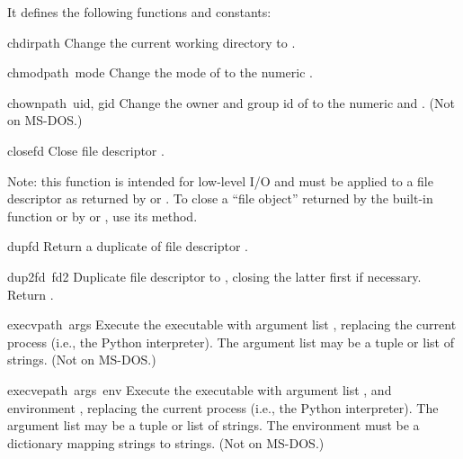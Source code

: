It defines the following functions and constants:

\renewcommand{\indexsubitem}{(in module posix)}
\begin{funcdesc}{chdir}{path}
Change the current working directory to .
\end{funcdesc}

\begin{funcdesc}{chmod}{path\, mode}
Change the mode of  to the numeric .
\end{funcdesc}

\begin{funcdesc}{chown}{path\, uid, gid}
Change the owner and group id of  to the numeric 
and .
(Not on MS-DOS.)
\end{funcdesc}

\begin{funcdesc}{close}{fd}
Close file descriptor .

Note: this function is intended for low-level I/O and must be applied
to a file descriptor as returned by  or
.  To close a ``file object'' returned by the
built-in function  or by  or
, use its  method.
\end{funcdesc}

\begin{funcdesc}{dup}{fd}
Return a duplicate of file descriptor .
\end{funcdesc}

\begin{funcdesc}{dup2}{fd\, fd2}
Duplicate file descriptor  to , closing the latter
first if necessary.  Return .
\end{funcdesc}

\begin{funcdesc}{execv}{path\, args}
Execute the executable  with argument list ,
replacing the current process (i.e., the Python interpreter).
The argument list may be a tuple or list of strings.
(Not on MS-DOS.)
\end{funcdesc}

\begin{funcdesc}{execve}{path\, args\, env}
Execute the executable  with argument list ,
and environment ,
replacing the current process (i.e., the Python interpreter).
The argument list may be a tuple or list of strings.
The environment must be a dictionary mapping strings to strings.
(Not on MS-DOS.)
\end{funcdesc}

